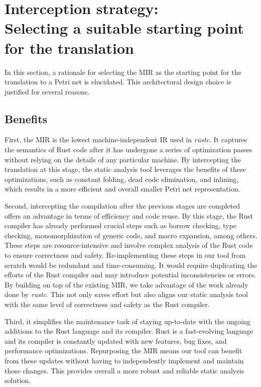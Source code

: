 \section[Interception strategy]
 {Interception strategy:\\Selecting a suitable starting point for the translation}
\label{sec:interception-strategy}

In this section, a rationale for selecting the \acrfull{MIR}
as the starting point for the translation to a Petri net is elucidated.
This architectural design choice is justified for several reasons.

\subsection{Benefits}

First, the \acrshort{MIR} is
the lowest machine-independent \acrshort{IR} used in \emph{rustc}.
It captures the semantics of Rust code
after it has undergone a series of optimization passes
without relying on the details of any particular machine.
By intercepting the translation at this stage,
the static analysis tool leverages the benefits of these optimizations,
such as constant folding, dead code elimination, and inlining,
which results in a more efficient and overall smaller Petri net representation.

Second, intercepting the compilation after the previous stages are completed
offers an advantage in terms of efficiency and code reuse.
By this stage, the Rust compiler has already performed crucial steps
such as borrow checking, type checking,
monomorphization of generic code, and macro expansion, among others.
These steps are resource-intensive
and involve complex analysis of the Rust code to ensure correctness and safety.
Re-implementing these steps in our tool from scratch
would be redundant and time-consuming.
It would require duplicating the efforts of the Rust compiler
and may introduce potential inconsistencies or errors.
By building on top of the existing \acrshort{MIR},
we take advantage of the work already done by \emph{rustc}.
This not only saves effort but also aligns our static analysis tool
with the same level of correctness and safety as the Rust compiler.

Third, it simplifies the maintenance task of staying up-to-date
with the ongoing additions to the Rust language and its compiler.
Rust is a fast-evolving language and its compiler is
constantly updated with new features, bug fixes, and performance optimizations.
Repurposing the \acrshort{MIR} means our tool can benefit from these updates
without having to independently implement and maintain those changes.
This provides overall a more robust and reliable static analysis solution.

